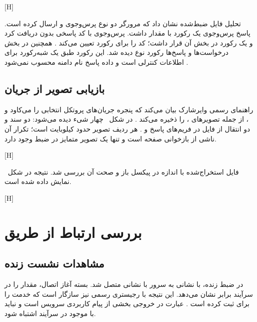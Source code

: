 [H]

تحلیل فایل ضبط‌شده نشان داد که مرورگر دو نوع پرس‌وجوی  و  ارسال کرده است.
پاسخ پرس‌وجوی  یک رکورد  با مقدار  داشت. پرس‌وجوی
 با کد  پاسخی بدون  دریافت کرد و یک رکورد  در بخش
 آن قرار داشت؛  کد  را برای رکورد  تعیین می‌کند .
همچنین در بخش  درخواست‌ها و پاسخ‌ها رکورد  نوع  دیده شد. این رکورد
طبق  یک شبه‌رکورد  برای اطلاعات کنترلی است و داده پاسخ نام دامنه محسوب
نمی‌شود .

\subsection{بازیابی تصویر از جریان }

راهنمای رسمی وایرشارک بیان می‌کند که پنجره 
جریان‌های پروتکل انتخابی را می‌کاود و
، از جمله تصویرهای ، را ذخیره می‌کند .
در شکل~ چهار شیء دیده می‌شود: دو سند  و دو انتقال از فایل
 در فریم‌های پاسخ  و . هر ردیف تصویر حدود  کیلوبایت است؛ تکرار
آن ناشی از بازخوانی صفحه است و تنها یک تصویر متمایز در ضبط وجود دارد.

[H]

فایل استخراج‌شده با اندازه  در  پیکسل باز و صحت آن بررسی شد. نتیجه در
شکل~ نمایش داده شده است.

[H]

\section{بررسی ارتباط از طریق }

\subsection{مشاهدات نشست زنده }

در ضبط زنده،  با نشانی  به سرور  با نشانی
 متصل شد. بسته آغاز اتصال، مقدار  را در سرآیند
 برابر  نشان می‌دهد. این نتیجه با رجیستری رسمی  نیز سازگار است که
خدمت  را برای  ثبت کرده است . عبارت
 در خروجی  بخشی از پیام کاربردی سرویس
است و نباید با  موجود در سرآیند  اشتباه شود.

